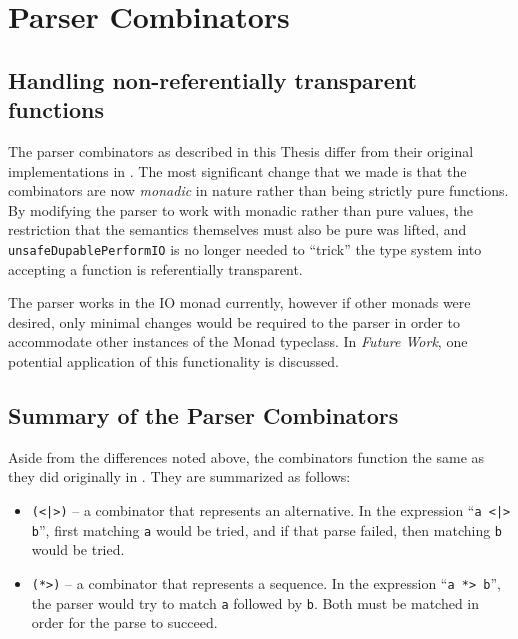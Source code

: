 \documentclass[../main.tex]{subfiles}
\begin{document}
\chapter{Parser Combinators}

\section{Handling non-referentially transparent functions}

The parser combinators as described in this Thesis differ from their original implementations
in \cite{frosthafiz2008}.  The most significant change that we made is that the combinators are now {\em monadic} in nature rather than being strictly pure functions.
By modifying the parser to work with monadic rather than pure values, the restriction that the semantics themselves must also be pure was lifted, and
\texttt{unsafeDupablePerformIO} is no longer needed to ``trick'' the type system into accepting a function is referentially transparent.

The parser works in the IO monad currently, however if other monads were desired, only minimal changes would be required to the parser in order to accommodate
other instances of the Monad typeclass.  In {\em Future Work}, one potential application of this functionality is discussed.

\section{Summary of the Parser Combinators}

Aside from the differences noted above, the combinators function the same as they did originally in \cite{frosthafiz2008}.  They are summarized as follows:

\begin{itemize}
	\item \texttt{(<|>)} -- a combinator that represents an alternative.  In the expression ``\texttt{a <|> b}'', first matching \texttt{a} would be tried, and if that parse failed, then matching \texttt{b} would be tried.
	\item \texttt{(*>)} -- a combinator that represents a sequence.  In the expression ``\texttt{a *> b}'', the parser would try to match \texttt{a} followed by \texttt{b}.  Both must be matched in order for the parse to succeed.
\end{itemize}
\end{document}
